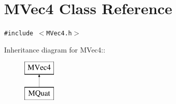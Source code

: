 \hypertarget{class_m_vec4}{
\section{MVec4 Class Reference}
\label{class_m_vec4}
}
{\tt \#include $<$MVec4.h$>$}

Inheritance diagram for MVec4::\begin{figure}[H]
\begin{center}
\leavevmode
\includegraphics[height=2cm]{class_m_vec4}
\end{center}
\end{figure}

